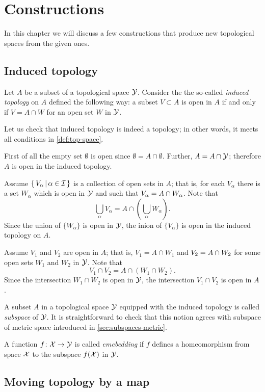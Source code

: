 \chapter{Constructions}

In this chapter we will discuss a few constructions that produce new topological spaces from the given ones.

\section{Induced topology}\label{sec:induced-topology}

Let $A$ be a subset of a topological space $\mathcal{Y}$.
Consider the the so-called \emph{induced topology} on $A$ defined the following way:
a subset $V\subset A$ is open in $A$ if and only if $V=A\cap W$ for an open set $W$ in $\mathcal{Y}$.

Let us check that induced topology is indeed a topology;
in other words, it meets all conditions in \ref{def:top-space}.

First of all the empty set
$\emptyset$ is open since $\emptyset=A\cap \emptyset$.
Further, $A=A\cap \mathcal{Y}$;
therefore $A$ is open in the induced topology.

Assume $\left\{\,{V_\alpha}\,\middle|\,{\alpha\in\mathcal{I}}\,\right\}$ is a collection of open sets in $A$;
that is, for each $V_\alpha$ there is a set $W_\alpha$ which is open in $\mathcal{Y}$ and such that $V_\alpha\z=A\cap W_\alpha$.
Note that
\[\bigcup_\alpha V_\alpha=A\cap\left(\bigcup_\alpha W_\alpha\right).\]
Since the union of $\{W_\alpha\}$ is open in $\mathcal{Y}$, the inion of $\{V_\alpha\}$ is open in the induced topology on $A$.

Assume $V_1$ and $V_2$ are open in $A$; 
that is, $V_1=A\cap W_1$ and  $V_2\z=A\cap W_2$ for some open sets $W_1$ and $W_2$ in $\mathcal{Y}$.
Note that
\[V_1\cap V_2=A\cap(W_1\cap W_2).\]
Since the intersection $W_1\cap W_2$ is open in $\mathcal{Y}$,
the intersection $V_1\cap V_2$ is open in $A$.


A subset $A$ in a topological space $\mathcal{Y}$ equipped with the induced topology is called \emph{subspace} of $\mathcal{Y}$.
It is straightforward to check that this notion agrees with subspace of metric space introduced in \ref{sec:subspaces-metric}.

A function $f\colon\mathcal{X}\to \mathcal{Y}$ is called \emph{emebedding} if $f$ defines a homeomorphism from space $\mathcal{X}$ to the subspace $f(\mathcal{X})$ in $\mathcal{Y}$.

\section{Moving topology by a map}

